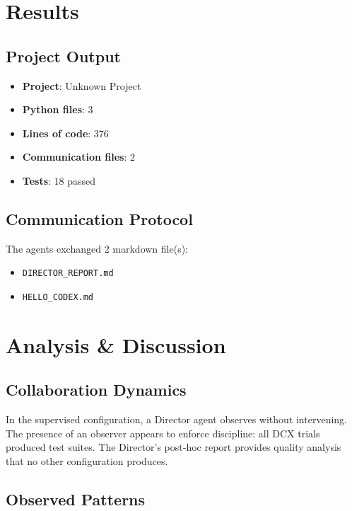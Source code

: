 \documentclass[11pt,a4paper]{article}
\begin{document}
\section{Results}

\subsection{Project Output}

\begin{itemize}
  \item \textbf{Project}: Unknown Project
  \item \textbf{Python files}: 3
  \item \textbf{Lines of code}: 376
  \item \textbf{Communication files}: 2
  \item \textbf{Tests}: 18 passed
\end{itemize}

\subsection{Communication Protocol}

The agents exchanged 2 markdown file(s):
\begin{itemize}
  \item \texttt{DIRECTOR\_REPORT.md}
  \item \texttt{HELLO\_CODEX.md}
\end{itemize}

\section{Analysis \& Discussion}

\subsection{Collaboration Dynamics}

In the supervised configuration, a Director agent observes without intervening. The presence of an observer appears to enforce discipline: all DCX trials produced test suites. The Director's post-hoc report provides quality analysis that no other configuration produces.

\subsection{Observed Patterns}
\end{document}
